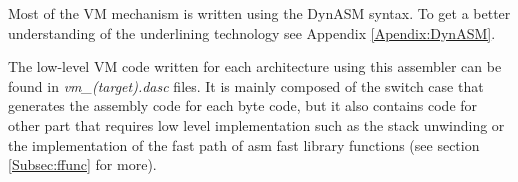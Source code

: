 Most of the VM mechanism is written using the DynASM syntax. To get a better
understanding of the underlining technology see Appendix \ref{Apendix:DynASM}.

The low-level VM code written for each architecture using this assembler can be
found in \emph{vm\_(target).dasc} files. It is mainly composed of the switch
case that generates the assembly code for each byte code, but it also contains
code for other part that requires low level implementation such as the
stack unwinding or the implementation of the fast path of asm fast library functions
(see section \ref{Subsec:ffunc} for more).